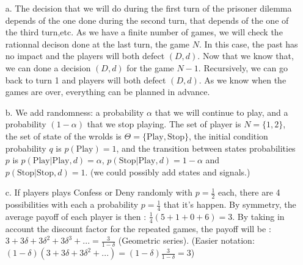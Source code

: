 \begin{itemize}
  \item[a.] The decision that we will do during the first turn of the prisoner dilemma depends of the one done during the second turn,
  that depends of the one of the third turn,etc. As we have a finite number of games, we will check the rationnal decison done at the last turn,
  the game $N$.
  In this case, the past has no impact and the players will both defect $(D,d)$. Now that we know that, we can done a decision $(D,d)$
  for the game $N-1$. Recursively, we can go back to turn 1 and players will both defect $(D,d)$.
  As we know when the games are over, everything can be planned in advance.
  \item[b.] We add randomness: a probability $\alpha$ that we will continue to play, and a probability $(1-\alpha)$ that we stop playing.
  The set of player is $N = \{1,2\}$, the set of state of the wrolds is $\Theta = \{\text{Play},\text{Stop}\}$, the initial condition probability
  $q$ is $p(\text{Play})= 1$, and the transition between states probabilities $p$ is $p(\text{Play}|\text{Play},d)=\alpha$,
  $p(\text{Stop}|\text{Play},d)=1-\alpha$ and $p(\text{Stop}|\text{Stop},d)=1$. 
  (we could possibly add states and signals.)
  \item[c.] If players plays Confess or Deny randomly with $p=\frac{1}{2}$ each, there are 4 possibilities with each a
  probability $p=\frac{1}{4}$ that it's happen.
  By symmetry, the average payoff of each player is then : $\frac{1}{4}(5+1+0+6) = 3$.
  By taking in account the discount factor for the repeated games, the payoff will be : $3 + 3\delta + 3\delta^2 + 3\delta^3 +... =
  \frac{3}{1-\delta}$ (Geometric series).
  (Easier notation: $(1-\delta)(3+3\delta+3\delta^2+...) = (1-\delta)\frac{3}{1-\delta} = 3$) 
\end{itemize}
